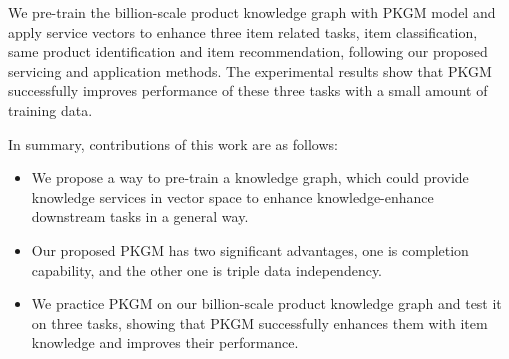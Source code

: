 We pre-train the billion-scale product knowledge graph with PKGM model and apply service vectors to enhance three item related tasks, item classification, same product identification and item recommendation, following our proposed servicing and application methods. The experimental results show that PKGM successfully improves performance of these three tasks with a small amount of training data. 

In summary, contributions of this work are as follows: 
\begin{itemize}
    \item We propose a way to pre-train a knowledge graph, which could provide knowledge services in vector space to enhance knowledge-enhance downstream tasks in a general way. 
    \item Our proposed PKGM has two significant advantages, one is completion capability, and the other one is triple data independency.
    \item We practice PKGM on our billion-scale product knowledge graph and test it on three tasks, showing that PKGM successfully enhances them with item knowledge and improves their performance.
\end{itemize}
